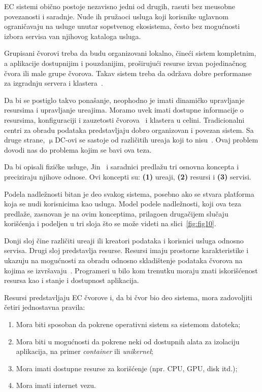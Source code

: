 EC sistemi obi\v cno postoje nezavisno jedni od drugih, rasuti bez me\dj usobne povezanosti i saradnje. Nude ih pru\v zaoci usluga koji korisnike uglavnom ograni\v cavaju na usluge unutar sopstvenog ekosistema, \v cesto bez mogu\'cnosti izbora servisa van njihovog kataloga usluga. 

Grupisani čvorovi treba da budu organizovani lokalno, \v cine\'ci sistem kompletnim, a aplikacije dostupnijim i pouzdanijim, pro\v siruju\'ci resurse izvan pojedina\v cnog \v cvora ili male grupe \v cvorova. Takav sistem treba da odr\v zava dobre performanse za izgradnju servera i klastera~\cite{ArocaG12}.

Da bi se postiglo takvo pona\v sanje, neophodno je imati dinami\v cko upravljanje resursima i upravljanje ure\dj ajima. Moramo uvek imati dostupne informacije o resursima, konfiguraciji i zauzetosti \v cvorova~\cite{GubbiBMP13, WangZZWYW17} i klastera u celini. Tradicionalni centri za obradu podataka predstavljaju dobro organizovan i povezan sistem. Sa druge strane, $\upmu$DC-ovi se sastoje od razli\v citih ure\dj aja koji to nisu~\cite{JiangCGZW19}. Ovaj problem dovodi nas do problema kojim se bavi ova teza.

Da bi opisali fizi\v cke usluge, Jin~\cite {JinCJL14} i saradnici predla\v zu tri osnovna koncepta i preciziraju njihove odnose. Ovi koncepti su: \textbf{(1)} ure\dj aji, \textbf{(2)} resursi i \textbf{(3)} servisi. 

Podela nadle\v znosti bitan je deo svakog sistema, posebno ako se stvara platforma koja se nudi korisnicima kao usluga. Model podele nadle\v znosti, koji ova teza predla\v ze, zasnovan je na ovim konceptima, prilago\dj en druga\v cijem slu\v caju kori\v s\'cenja i  podeljen u tri sloja \v sto se mo\v ze videti na slici~\ref {fig:fig10}. 

Donji sloj \v cine razli\v citi ure\dj aji ili kreatori podataka i korisnici usluga odnosno servisa. Drugi sloj predstavlja resurse. Resursi imaju prostorne karakteristike i ukazuju na mogu\'cnosti za obradu odnosno skladi\v stenje podataka \v cvorova na kojima se izvr\v savaju~\cite{JinCJL14}. Programeri u bilo kom trenutku moraju znati iskori\v s\'cenost resursa kao i stanje i dostupnost aplikacija. 

Resursi predstavljaju EC \v cvorove i, da bi \v cvor bio deo sistema, mora zadovoljiti \v cetiri jednostavna pravila: 

\begin{enumerate}[start=1,label={(\bfseries \arabic*)}]
\item Mora biti sposoban da pokrene operativni sistem sa sistemom datoteka;
\item Mora biti u mogu\'cnosti da pokrene neki od dostupnih alata za izolaciju aplikacija, na primer \textit{container} ili \textit{unikernel}; 
\item Mora imati dostupne resurse za kori\v s\'cenje (npr. CPU, GPU, disk itd.);
\item Mora imati internet vezu.
\end{enumerate}

